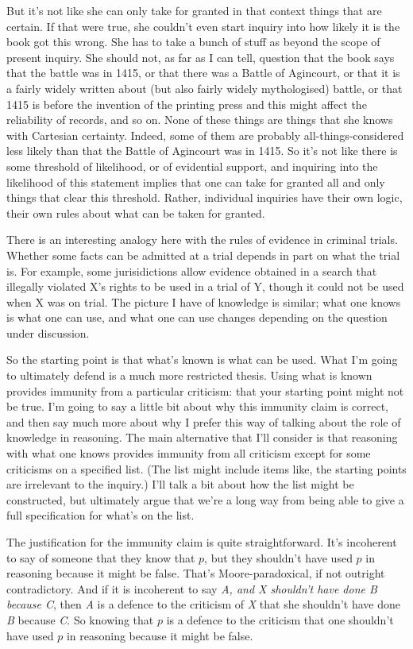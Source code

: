 \documentclass[11pt,]{book}
\begin{document}
But it's not like she can only take for granted in that context things that are certain. If that were true, she couldn't even start inquiry into how likely it is the book got this wrong. She has to take a bunch of stuff as beyond the scope of present inquiry. She should not, as far as I can tell, question that the book says that the battle was in 1415, or that there was a Battle of Agincourt, or that it is a fairly widely written about (but also fairly widely mythologised) battle, or that 1415 is before the invention of the printing press and this might affect the reliability of records, and so on. None of these things are things that she knows with Cartesian certainty. Indeed, some of them are probably all-things-considered less likely than that the Battle of Agincourt was in 1415. So it's not like there is some threshold of likelihood, or of evidential support, and inquiring into the likelihood of this statement implies that one can take for granted all and only things that clear this threshold. Rather, individual inquiries have their own logic, their own rules about what can be taken for granted.

There is an interesting analogy here with the rules of evidence in criminal trials. Whether some facts can be admitted at a trial depends in part on what the trial is. For example, some jurisidictions allow evidence obtained in a search that illegally violated X's rights to be used in a trial of Y, though it could not be used when X was on trial. The picture I have of knowledge is similar; what one knows is what one can use, and what one can use changes depending on the question under discussion.

So the starting point is that what's known is what can be used. What I'm going to ultimately defend is a much more restricted thesis. Using what is known provides immunity from a particular criticism: that your starting point might not be true. I'm going to say a little bit about why this immunity claim is correct, and then say much more about why I prefer this way of talking about the role of knowledge in reasoning. The main alternative that I'll consider is that reasoning with what one knows provides immunity from all criticism except for some criticisms on a specified list. (The list might include items like, the starting points are irrelevant to the inquiry.) I'll talk a bit about how the list might be constructed, but ultimately argue that we're a long way from being able to give a full specification for what's on the list.

The justification for the immunity claim is quite straightforward. It's incoherent to say of someone that they know that \(p\), but they shouldn't have used \(p\) in reasoning because it might be false. That's Moore-paradoxical, if not outright contradictory. And if it is incoherent to say \emph{A, and X shouldn't have done B because C}, then \emph{A} is a defence to the criticism of \emph{X} that she shouldn't have done \emph{B} because \emph{C}. So knowing that \(p\) is a defence to the criticism that one shouldn't have used \(p\) in reasoning because it might be false.
\end{document}
